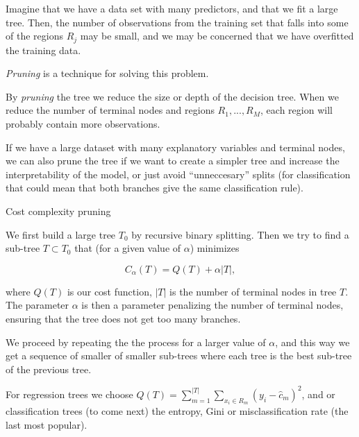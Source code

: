 \documentclass[
  ignorenonframetext,
]{beamer}
\begin{document}
\begin{frame}

Imagine that we have a data set with many predictors, and that we fit a
large tree. Then, the number of observations from the training set that
falls into some of the regions \(R_j\) may be small, and we may be
concerned that we have overfitted the training data.

\emph{Pruning} is a technique for solving this problem.

By \emph{pruning} the tree we reduce the size or depth of the decision
tree. When we reduce the number of terminal nodes and regions
\(R_1,...,R_M\), each region will probably contain more observations.

If we have a large dataset with many explanatory variables and terminal
nodes, we can also prune the tree if we want to create a simpler tree
and increase the interpretability of the model, or just avoid
``unneccesary'' splits (for classification that could mean that both
branches give the same classification rule).

\end{frame}

\begin{frame}

\begin{block}{Cost complexity pruning}

We first build a large tree \(T_0\) by recursive binary splitting. Then
we try to find a sub-tree \(T\subset T_0\) that (for a given value of
\(\alpha\)) minimizes

\[
C_{\alpha}(T)=Q(T)+\alpha |T|,
\]

where \(Q(T)\) is our cost function, \(|T|\) is the number of terminal
nodes in tree \(T\). The parameter \(\alpha\) is then a parameter
penalizing the number of terminal nodes, ensuring that the tree does not
get too many branches.

We proceed by repeating the the process for a larger value of
\(\alpha\), and this way we get a sequence of smaller of smaller
sub-trees where each tree is the best sub-tree of the previous tree.

For regression trees we choose
\(Q(T)=\sum_{m=1}^{|T|}\sum_{x_i\in R_m}(y_i - \hat{c}_m)^2\), and or
classification trees (to come next) the entropy, Gini or
misclassification rate (the last most popular).

\end{block}

\end{frame}
\end{document}
